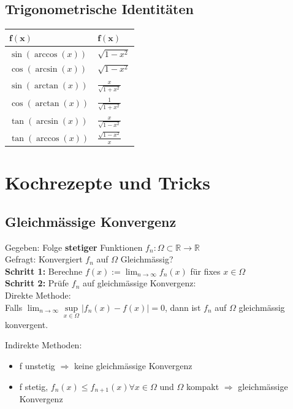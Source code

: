\documentclass[a4paper,10pt]{article}
\def\limn{\lim_{n\to \infty}}
\def\R{\mathbb{R}}
\begin{document}
\subsection{Trigonometrische Identitäten}
\begin{center}
 \begin{tabularx}{\linewidth}{>{\centering\arraybackslash}X>{\centering\arraybackslash}X}
  \toprule
  $\mathbf{f(x)}$ & $\mathbf{f(x)}$ \\
  \midrule
  $\sin(\arccos (x))$ & $\sqrt{1-x^2}$\\
  $\cos(\arcsin(x))$ & $\sqrt{1-x^2}$\\
  $\sin(\arctan(x))$ & $\frac{x}{\sqrt{1+x^2}}$\\
  $\cos(\arctan(x))$ & $\frac{1}{\sqrt{1+x^2}}$\\
  $\tan(\arcsin(x))$ & $\frac{x}{\sqrt{1-x^2}}$\\
  $\tan(\arccos(x))$ & $\frac{\sqrt{1-x^2}}{x}$\\
  \bottomrule
 \end{tabularx}
\end{center}

\section{Kochrezepte und Tricks}

\subsection{Gleichmässige Konvergenz}
\begin{subbox}{}
  Gegeben: Folge \textbf{stetiger} Funktionen $f_n : \Omega \subset \R \to \R$\\
  Gefragt: Konvergiert $f_n$ auf $\Omega$ Gleichmässig?\\
  \textbf{Schritt 1:} Berechne $f(x) := \limn f_n(x)$ für fixes $x \in \Omega$\\
  \textbf{Schritt 2:} Prüfe $f_n$ auf gleichmässige Konvergenz:\\
  Direkte Methode:\\
  Falls $\limn \underset{x\in\Omega}{\sup} |f_n(x) - f(x)| = 0$, dann ist $f_n$ auf $\Omega$ gleichmässig konvergent.

  Indirekte Methoden:
  \begin{itemize}
    \item f unstetig $\Rightarrow$ keine gleichmässige Konvergenz
    \item f stetig, $f_n(x) \leq f_{n+1}(x) \forall x \in \Omega$ und $\Omega$ kompakt $\Rightarrow$ gleichmässige Konvergenz
  \end{itemize}
\end{subbox}
\end{document}
